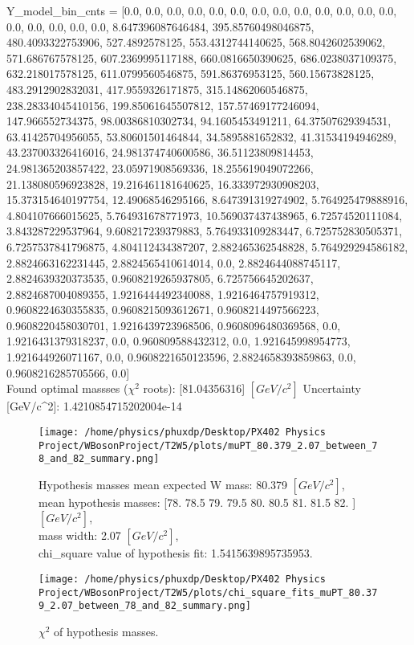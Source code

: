 \documentclass[12pt]{article}
\begin{document}
	Y\_model\_bin\_cnts = [0.0, 0.0, 0.0, 0.0, 0.0, 0.0, 0.0, 0.0, 0.0, 0.0, 0.0, 0.0, 0.0, 0.0, 0.0, 0.0, 0.0, 0.0, 8.647396087646484, 395.85760498046875, 480.4093322753906, 527.4892578125, 553.4312744140625, 568.8042602539062, 571.686767578125, 607.2369995117188, 660.0816650390625, 686.0238037109375, 632.218017578125, 611.0799560546875, 591.86376953125, 560.15673828125, 483.2912902832031, 417.9559326171875, 315.14862060546875, 238.28334045410156, 199.85061645507812, 157.57469177246094, 147.966552734375, 98.00386810302734, 94.1605453491211, 64.37507629394531, 63.41425704956055, 53.80601501464844, 34.5895881652832, 41.31534194946289, 43.237003326416016, 24.981374740600586, 36.51123809814453, 24.981365203857422, 23.05971908569336, 18.255619049072266, 21.138080596923828, 19.216461181640625, 16.333972930908203, 15.373154640197754, 12.49068546295166, 8.647391319274902, 5.764925479888916, 4.804107666015625, 5.764931678771973, 10.569037437438965, 6.72574520111084, 3.843287229537964, 9.608217239379883, 5.764933109283447, 6.725752830505371, 6.7257537841796875, 4.804112434387207, 2.882465362548828, 5.764929294586182, 2.8824663162231445, 2.8824565410614014, 0.0, 2.8824644088745117, 2.8824639320373535, 0.9608219265937805, 6.725756645202637, 2.8824687004089355, 1.9216444492340088, 1.9216464757919312, 0.9608224630355835, 0.9608215093612671, 0.9608214497566223, 0.9608220458030701, 1.9216439723968506, 0.9608096480369568, 0.0, 1.9216431379318237, 0.0, 0.960809588432312, 0.0, 1.921645998954773, 1.921644926071167, 0.0, 0.9608221650123596, 2.8824658393859863, 0.0, 0.9608216285705566, 0.0]\\

    Found optimal massses ($\chi^2$ roots): [81.04356316] $[GeV/c^{2}]$
    Uncertainty [GeV/c^2]: 1.4210854715202004e-14

	\begin{figure}[tb]
		\centering
		\texttt{[image: /home/physics/phuxdp/Desktop/PX402 Physics Project/WBosonProject/T2W5/plots/muPT\_80.379\_2.07\_between\_78\_and\_82\_summary.png]}
		\caption{\small Hypothesis masses mean expected W mass: 80.379 $[GeV/c^{2}]$,\\
mean hypothesis masses: [78.  78.5 79.  79.5 80.  80.5 81.  81.5 82. ] $[GeV/c^{2}]$,\\
mass width: 2.07 $[GeV/c^{2}]$,\\
chi_square value of hypothesis fit: 1.5415639895735953. }
		\label{fig: fig_0}
	\end{figure}

       \begin{figure}[tb]
		\centering
		\texttt{[image: /home/physics/phuxdp/Desktop/PX402 Physics Project/WBosonProject/T2W5/plots/chi\_square\_fits\_muPT\_80.379\_2.07\_between\_78\_and\_82\_summary.png]}
		\caption{\small $\chi^2$ of hypothesis masses. }
		\label{fig: fig_chi_square}
	\end{figure}
\end{document}
